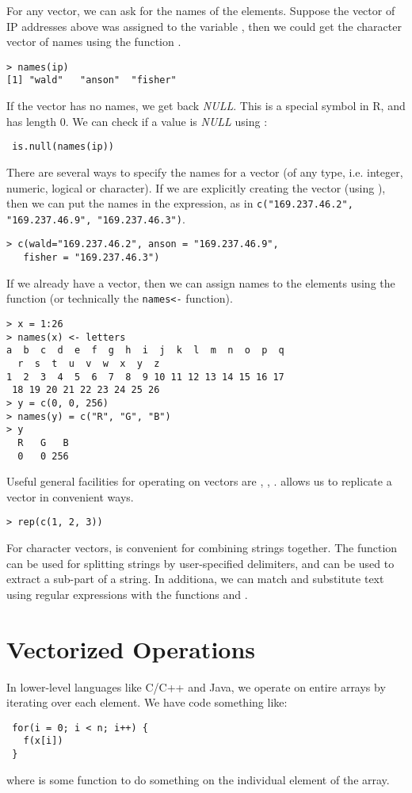 For any vector, we can ask for the names of the elements. Suppose the
vector of IP addresses above was assigned to the variable
, then we could get the character vector of names using
the function .
\begin{verbatim}
> names(ip)
[1] "wald"   "anson"  "fisher"
\end{verbatim}
If the vector has no names, we get back \textsl{NULL}. This is a
special symbol in R, and has length 0. We can check if a value is
\textsl{NULL} using :
\begin{verbatim}
 is.null(names(ip))
\end{verbatim}


There are several ways to specify the names for a vector (of any type,
i.e. integer, numeric, logical or character). If we are explicitly
creating the vector (using ), then we can put the names
in the expression, as in
\verb|c("169.237.46.2", "169.237.46.9", "169.237.46.3")|.
\begin{verbatim}
> c(wald="169.237.46.2", anson = "169.237.46.9", 
   fisher = "169.237.46.3")
\end{verbatim}
If we already have a vector, then we can assign names to the elements
using the  function (or technically the
\verb+names<-+ function).
\begin{verbatim}
> x = 1:26
> names(x) <- letters
a  b  c  d  e  f  g  h  i  j  k  l  m  n  o  p  q 
  r  s  t  u  v  w  x  y  z 
1  2  3  4  5  6  7  8  9 10 11 12 13 14 15 16 17 
 18 19 20 21 22 23 24 25 26 
> y = c(0, 0, 256)
> names(y) = c("R", "G", "B")
> y
  R   G   B 
  0   0 256 
\end{verbatim}
Useful general facilities for operating on vectors are
, , . 
allows us to replicate a vector in convenient ways.
\begin{verbatim}
> rep(c(1, 2, 3))
\end{verbatim}
For character vectors,  is convenient for combining
strings together. The function  can be used for
splitting strings by user-specified delimiters, and
 can be used to extract a sub-part of a
string. In additiona, we can match and substitute text using regular
expressions with the functions  and .

 
\section{Vectorized Operations}
In lower-level languages like C/C++ and Java, we operate on entire
arrays by iterating over each element. We have code something like:
\begin{verbatim}
 for(i = 0; i < n; i++) {
   f(x[i])
 }
\end{verbatim}
where  is some function to do something on the individual
element of the array.

